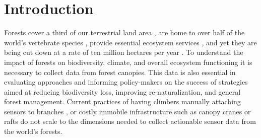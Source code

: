 

\section{Introduction}
% 
% 
% 
% 



Forests cover a third of our terrestrial land area \cite{FAO2020a}, are home to over half of the world’s vertebrate species \cite{Pillay2022}, provide essential ecosystem services \cite{Brockerhoff2017}, and yet they are being cut down at a rate of ten million hectares per year \cite{FAO2020a}.
To understand the impact of forests on biodiversity, climate, and overall ecosystem functioning it is necessary to collect data from forest canopies. 
This data is also essential in evaluating approaches and informing policy-makers on the success of strategies aimed at reducing biodiversity loss, improving re-naturalization, and general forest management. Current practices of having climbers manually attaching sensors to branches \cite{Anderson2020a}, or costly immobile  infrastructure such as canopy cranes or rafts \cite{Cannon2021} do not scale to the dimensions needed to collect actionable sensor data from the world’s forests. 

